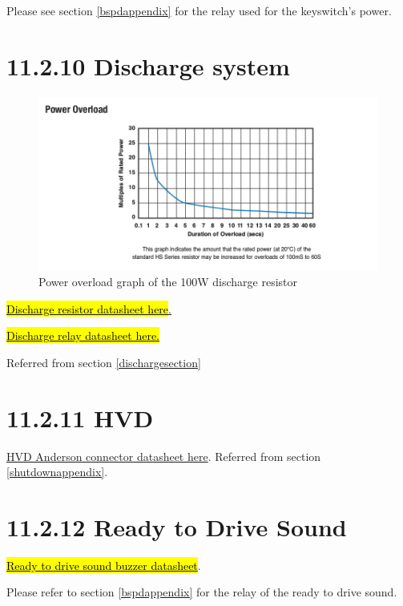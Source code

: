 \documentclass{article}
\DeclareRobustCommand{\hlr}[1]{{\sethlcolor{red}\hl{#1}}}
\begin{document}
Please see section \ref{bspdappendix} for the relay used for the keyswitch's power.

\section*{11.2.10 Discharge system} \label{dischargeappendix}

\begin{figure}[H]
    \centering
    \includegraphics[width = 0.8 \textwidth]{Dischargeres}
    \caption{Power overload graph of the 100W discharge resistor}
    \label{disres}
\end{figure}

\href{http://www.farnell.com/datasheets/1498243.pdf}{\hlr{Discharge resistor datasheet here}.}

\href{http://cotorelay.com/product/5500-series-high-voltage-reed-relays/}{\hlr{Discharge relay datasheet here.}}

Referred from section \ref{dischargesection}

\section*{11.2.11 HVD } \label{hvdappendix}

\href{http://www.andersonpower.com/_global-assets/downloads/pdf/ds-smart.pdf}{HVD Anderson connector datasheet here}. Referred from section \ref{shutdownappendix}.

\section*{11.2.12 Ready to Drive Sound} \label{r2dappendix}

\href{http://www.mouser.com/ds/2/252/SC648ANR-63353.pdf}{\hlr{Ready to drive sound buzzer datasheet}}.

Please refer to section \ref{bspdappendix} for the relay of the ready to drive sound.
\end{document}
